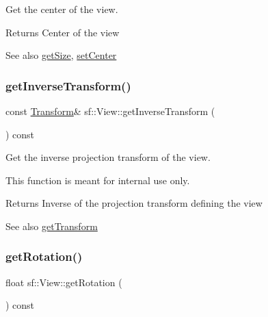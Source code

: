 Get the center of the view. 

\begin{DoxyReturn}{Returns}
Center of the view
\end{DoxyReturn}
\begin{DoxySeeAlso}{See also}
\hyperlink{classsf_1_1_view_a5432748dd3a78ac4019dfbde208c7cc1}{get\+Size}, \hyperlink{classsf_1_1_view_aa8e3fedb008306ff9811163545fb75f2}{set\+Center} 
\end{DoxySeeAlso}
\mbox{\label{classsf_1_1_view_acd2b001cf2a646f62e7d9e792d7d5f0d}} 
\subsubsection{\texorpdfstring{get\+Inverse\+Transform()}{getInverseTransform()}}
{\footnotesize\ttfamily const \hyperlink{classsf_1_1_transform}{Transform}\& sf\+::\+View\+::get\+Inverse\+Transform (\begin{DoxyParamCaption}{ }\end{DoxyParamCaption}) const}



Get the inverse projection transform of the view. 

This function is meant for internal use only.

\begin{DoxyReturn}{Returns}
Inverse of the projection transform defining the view
\end{DoxyReturn}
\begin{DoxySeeAlso}{See also}
\hyperlink{classsf_1_1_view_a13da786526688bf99dc2cd3e658a3c2a}{get\+Transform} 
\end{DoxySeeAlso}
\mbox{\label{classsf_1_1_view_a324d8885f4ab17f1f7b0313580c9b84e}} 
\subsubsection{\texorpdfstring{get\+Rotation()}{getRotation()}}
{\footnotesize\ttfamily float sf\+::\+View\+::get\+Rotation (\begin{DoxyParamCaption}{ }\end{DoxyParamCaption}) const}



